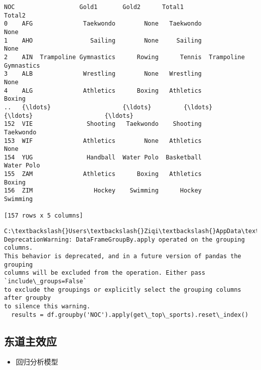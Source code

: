\documentclass[11pt]{article}
\providecommand{\tightlist}{%
      \setlength{\itemsep}{0pt}\setlength{\parskip}{0pt}}
\begin{document}
    \begin{Verbatim}[commandchars=\\\{\}]
     NOC                  Gold1       Gold2      Total1                 Total2
0    AFG              Taekwondo        None   Taekwondo                   None
1    AHO                Sailing        None     Sailing                   None
2    AIN  Trampoline Gymnastics      Rowing      Tennis  Trampoline Gymnastics
3    ALB              Wrestling        None   Wrestling                   None
4    ALG              Athletics      Boxing   Athletics                 Boxing
..   {\ldots}                    {\ldots}         {\ldots}         {\ldots}                    {\ldots}
152  VIE               Shooting   Taekwondo    Shooting              Taekwondo
153  WIF              Athletics        None   Athletics                   None
154  YUG               Handball  Water Polo  Basketball             Water Polo
155  ZAM              Athletics      Boxing   Athletics                 Boxing
156  ZIM                 Hockey    Swimming      Hockey               Swimming

[157 rows x 5 columns]
    \end{Verbatim}

    \begin{Verbatim}[commandchars=\\\{\}]
C:\textbackslash{}Users\textbackslash{}Ziqi\textbackslash{}AppData\textbackslash{}Local\textbackslash{}Temp\textbackslash{}ipykernel\_20880\textbackslash{}3729593612.py:31:
DeprecationWarning: DataFrameGroupBy.apply operated on the grouping columns.
This behavior is deprecated, and in a future version of pandas the grouping
columns will be excluded from the operation. Either pass `include\_groups=False`
to exclude the groupings or explicitly select the grouping columns after groupby
to silence this warning.
  results = df.groupby('NOC').apply(get\_top\_sports).reset\_index()
    \end{Verbatim}

    \subsection{东道主效应}\label{ux4e1cux9053ux4e3bux6548ux5e94}

    \begin{itemize}
\tightlist
\item
  回归分析模型
\end{itemize}
\end{document}
